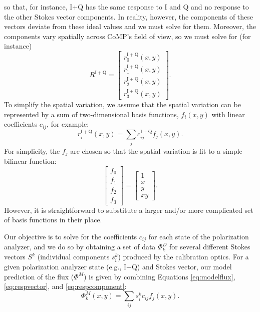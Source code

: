 \documentclass[11pt]{article}
\begin{document}
so that, for instance, I+Q has the same response to I and Q and no response to the other Stokes vector components. In reality, however, the components of these vectors deviate from these ideal values and we must solve for them. Moreover, the components vary spatially across CoMP's field of view, so we must solve for (for instance)
\begin{equation}\label{eq:respvector}
	R^{\mathrm{I+Q}} =
		\begin{bmatrix}
			r^{\mathrm{I+Q}}_0(x,y) \\ r^{\mathrm{I+Q}}_1(x,y) \\ r^{\mathrm{I+Q}}_2(x,y) \\ r^{\mathrm{I+Q}}_3(x,y)
		\end{bmatrix}.
\end{equation}
To simplify the spatial variation, we assume that the spatial variation can be represented by a sum of two-dimensional basis functions, $f_{i}(x,y)$ with linear coefficients $c_{ij}$, for example:
\begin{equation}\label{eq:respcomponent}
	r^{\mathrm{I+Q}}_i(x,y) = \sum_j c^{\mathrm{I+Q}}_{ij}f_{j}(x,y).
\end{equation}
For simplicity, the $f_j$ are chosen so that the spatial variation is fit to a simple bilinear function:
\begin{equation}
		\begin{bmatrix}
			f_0 \\ f_1 \\ f_2 \\ f_3
		\end{bmatrix} = 
		\begin{bmatrix}
			1 \\ x \\ y \\ xy
		\end{bmatrix}.
\end{equation}
However, it is straightforward to substitute a larger and/or more complicated set of basis functions in their place.

Our objective is to solve for the coefficients $c_{ij}$ for each state of the polarization analyzer, and we do so by obtaining a set of data $\Phi^D_k$ for several different Stokes vectors $S^k$ (individual components $s^k_i$) produced by the calibration optics. For a given polarization analyzer state (e.g., I+Q) and Stokes vector, our model prediction of the flux ($\Phi^M$) is given by combining Equations \ref{eq:modelflux}, \ref{eq:respvector}, and \ref{eq:respcomponent}:
\begin{equation}
\Phi^M_k(x,y) = \sum_{ij} s^k_i c_{ij}f_{j}(x,y).
\end{equation}
\end{document}
